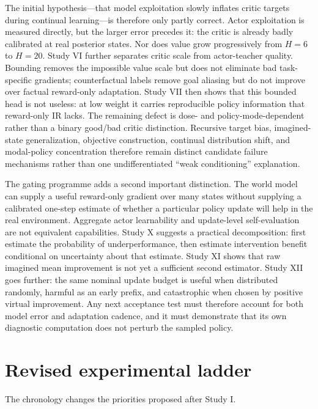 \documentclass[10pt]{article}
\begin{document}
The initial hypothesis---that model exploitation slowly inflates critic targets during continual learning---is therefore only partly correct. Actor exploitation is measured directly, but the larger error precedes it: the critic is already badly calibrated at real posterior states. Nor does value grow progressively from $H=6$ to $H=20$. Study VI further separates critic scale from actor-teacher quality. Bounding removes the impossible value scale but does not eliminate bad task-specific gradients; counterfactual labels remove goal aliasing but do not improve over factual reward-only adaptation. Study VII then shows that this bounded head is not useless: at low weight it carries reproducible policy information that reward-only IR lacks. The remaining defect is dose- and policy-mode-dependent rather than a binary good/bad critic distinction. Recursive target bias, imagined-state generalization, objective construction, continual distribution shift, and modal-policy concentration therefore remain distinct candidate failure mechanisms rather than one undifferentiated ``weak conditioning'' explanation.

The gating programme adds a second important distinction. The world model can
supply a useful reward-only gradient over many states without supplying a
calibrated one-step estimate of whether a particular policy update will help in
the real environment. Aggregate actor learnability and update-level
self-evaluation are not equivalent capabilities. Study X suggests a practical
decomposition: first estimate the probability of underperformance, then
estimate intervention benefit conditional on uncertainty about that estimate.
Study XI shows that raw imagined mean improvement is not yet a sufficient
second estimator. Study XII goes further: the same nominal update budget is
useful when distributed randomly, harmful as an early prefix, and catastrophic
when chosen by positive virtual improvement. Any next acceptance test must
therefore account for both model error and adaptation cadence, and it must
demonstrate that its own diagnostic computation does not perturb the sampled
policy.

\section{Revised experimental ladder}

The chronology changes the priorities proposed after Study I.
\end{document}
